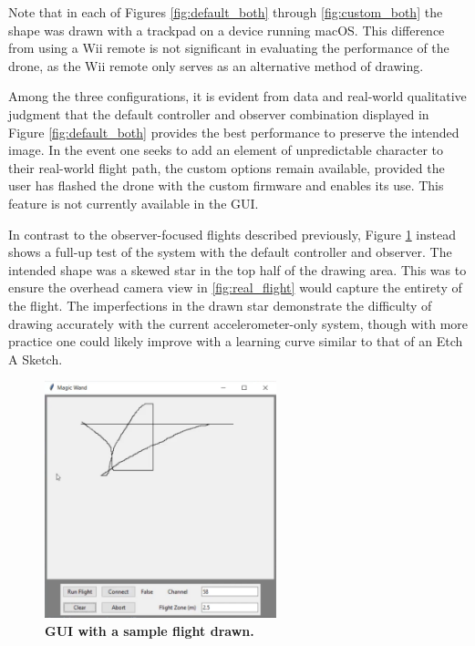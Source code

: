 \documentclass[conf]{new-aiaa}
\begin{document}
        Note that in each of Figures \ref{fig:default_both} through \ref{fig:custom_both} the shape was drawn with a trackpad on a device running macOS. This difference from using a Wii remote is not significant in evaluating the performance of the drone, as the Wii remote only serves as an alternative method of drawing.
        
        Among the three configurations, it is evident from data and real-world qualitative judgment that the default controller and observer combination displayed in Figure \ref{fig:default_both} provides the best performance to preserve the intended image. In the event one seeks to add an element of unpredictable character to their real-world flight path, the custom options remain available, provided the user has flashed the drone with the custom firmware and enables its use. This feature is not currently available in the GUI.
        
        In contrast to the observer-focused flights described previously, Figure \ref{fig:drawn_flight} instead shows a full-up test of the system with the default controller and observer. The intended shape was a skewed star in the top half of the drawing area. This was to ensure the overhead camera view in \ref{fig:real_flight} would capture the entirety of the flight. The imperfections in the drawn star demonstrate the difficulty of drawing accurately with the current accelerometer-only system, though with more practice one could likely improve with a learning curve similar to that of an Etch A Sketch.

        \begin{figure}[H]
        \centering
        \includegraphics[width=0.6\textwidth]{docs/reports/Final Project Update/images/drawn_flight_path.PNG}
        \caption{\textbf{GUI with a sample flight drawn.}}
        \label{fig:drawn_flight}
        \end{figure}
        
\end{document}
